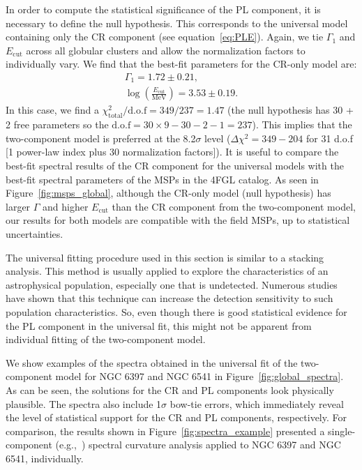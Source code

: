 \documentclass[doublespace,nopageskip]{VTthesis}
\begin{document}
In order to compute the statistical significance of the {PL} component, it is necessary to define the null hypothesis. This corresponds to the universal model containing only the CR component (see equation~\ref{eq:PLE}). Again, we tie $\Gamma_1$ and $E_\mathrm{cut}$ across all globular clusters and allow the normalization factors to individually vary. We find that the best-fit parameters for the CR-only model are:
\begin{align}\nonumber
    \Gamma_1 = 1.72 \pm 0.21, \\\nonumber
    \log\left(\frac{E_\mathrm{cut}}{\mathrm{MeV}}\right) = 3.53 \pm 0.19.
\end{align}
In this case, we find a $\chi^2_\mathrm{total} / \mathrm{d.o.f} = 349/237=1.47$ (the null hypothesis has 30 + 2 free parameters so the $\mathrm{d.o.f}=30\times 9 - 30 - 2 - 1 = 237$). This implies that the two-component model is preferred at the 8.2$\sigma$ level ($\Delta \chi^2=349-204$ for 31 d.o.f [1 power-law index plus 30 normalization factors]). It is useful to compare the best-fit spectral results of the CR component for the universal models with the best-fit spectral parameters of the MSPs in the 4FGL catalog. As seen in Figure~\ref{fig:msps_global}, although the CR-only model (null hypothesis) has larger $\Gamma$ and higher $E_\mathrm{cut}$ than the CR component from the two-component model, our results for both models are compatible with the field MSPs, up to statistical uncertainties.

The universal fitting procedure used in this section is similar to a stacking analysis. This method is usually applied to explore the characteristics of an astrophysical population, especially one that is undetected. Numerous studies have shown that this technique can increase the detection sensitivity to such population characteristics. So, even though there is good statistical evidence for the {PL} component in the universal fit,  this might not be apparent from individual fitting of the two-component model.

We show examples of the spectra obtained in the universal fit of the two-component model for NGC 6397 and NGC 6541 in Figure~\ref{fig:global_spectra}. As can be seen, the solutions for the CR and {PL} components look physically plausible. The spectra also include 1$\sigma$ bow-tie errors, which immediately reveal the level of statistical support for the CR and {PL} components, respectively. For comparison, the results shown in Figure~\ref{fig:spectra_example} presented a {single-component (e.g.,~\citet{2020ApJS..247...33A})} spectral curvature analysis applied to NGC 6397 and NGC 6541, individually. 
\end{document}
